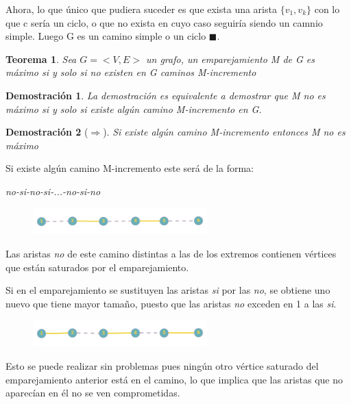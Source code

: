 \documentclass[a4paper,1pt]{report}
\newtheorem*{teo}{Teorema}
\newtheorem*{dem}{Demostración}
\begin{document}
Ahora, lo que \'unico que pudiera suceder es que exista una arista $\{v_1,v_k\}$ con lo que c sería un ciclo, o que no exista en cuyo caso seguiría siendo un camnio simple.  Luego G es un camino simple o un ciclo $\blacksquare$.


\begin{teo}
 Sea $G=<V,E>$ un grafo, un emparejamiento M de G es máximo si y solo si no existen en G caminos M-incremento
\end{teo}


\begin{dem}
La demostración es equivalente a demostrar que M no es máximo si y solo si existe algún camino M-incremento en G. 
\end{dem}

\begin{dem}[$\Rightarrow$]
    Si existe algún camino M-incremento entonces M no es máximo
\end{dem}

Si existe algún camino M-incremento este será de la forma:

\textit{no-si-no-si-...-no-si-no}

\begin{figure}[H]
    \centering
    \includegraphics[width=0.6\textwidth]{figures7/mincremento.png}
\end{figure} 

Las aristas \textit{no} de este camino distintas a las de los extremos contienen vértices que están saturados por el emparejamiento.

Si en el emparejamiento se sustituyen las aristas \textit{si} por las \textit{no}, se obtiene uno nuevo que tiene mayor tamaño, puesto que las aristas \textit{no}  exceden en 1 a las \textit{si}.
\begin{figure}[H]
    \centering
    \includegraphics[width=0.6\textwidth]{figures7/mnoincremento.png}
\end{figure} 

Esto se puede realizar sin problemas pues ningún otro vértice saturado del emparejamiento anterior está en el camino, lo que implica que las aristas que no aparecían en él no se ven comprometidas.\\
\end{document}
